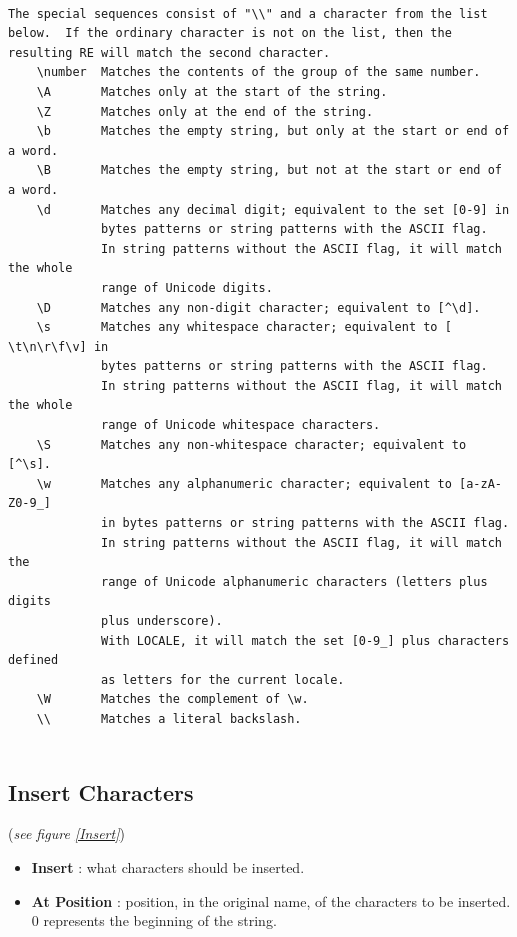 \documentclass[11pt, a4paper]{scrartcl}
\begin{document}
\begin{itemize}
\begin{verbatim}
   
The special sequences consist of "\\" and a character from the list
below.  If the ordinary character is not on the list, then the
resulting RE will match the second character.
    \number  Matches the contents of the group of the same number.
    \A       Matches only at the start of the string.
    \Z       Matches only at the end of the string.
    \b       Matches the empty string, but only at the start or end of a word.
    \B       Matches the empty string, but not at the start or end of a word.
    \d       Matches any decimal digit; equivalent to the set [0-9] in
             bytes patterns or string patterns with the ASCII flag.
             In string patterns without the ASCII flag, it will match the whole
             range of Unicode digits.
    \D       Matches any non-digit character; equivalent to [^\d].
    \s       Matches any whitespace character; equivalent to [ \t\n\r\f\v] in
             bytes patterns or string patterns with the ASCII flag.
             In string patterns without the ASCII flag, it will match the whole
             range of Unicode whitespace characters.
    \S       Matches any non-whitespace character; equivalent to [^\s].
    \w       Matches any alphanumeric character; equivalent to [a-zA-Z0-9_]
             in bytes patterns or string patterns with the ASCII flag.
             In string patterns without the ASCII flag, it will match the
             range of Unicode alphanumeric characters (letters plus digits
             plus underscore).
             With LOCALE, it will match the set [0-9_] plus characters defined
             as letters for the current locale.
    \W       Matches the complement of \w.
    \\       Matches a literal backslash.


\end{verbatim}
         \endgroup
\end{itemize}

\subsection*{Insert Characters}
(\emph{see figure \ref{Insert}})\\

\begin{itemize}
        \item \textbf{Insert} : what characters should be inserted.
        \item \textbf{At Position} : position, in the original name, of the characters to be inserted. 0 represents the beginning of the string.
\end{itemize}
\end{document}
